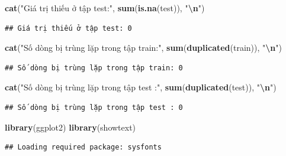 \documentclass[
]{article}
\newenvironment{Shaded}{\begin{snugshade}}{\end{snugshade}}
\newcommand{\FunctionTok}[1]{\textcolor[rgb]{0.13,0.29,0.53}{\textbf{#1}}}
\newcommand{\NormalTok}[1]{#1}
\newcommand{\SpecialCharTok}[1]{\textcolor[rgb]{0.81,0.36,0.00}{\textbf{#1}}}
\newcommand{\StringTok}[1]{\textcolor[rgb]{0.31,0.60,0.02}{#1}}
\begin{document}
\begin{Shaded}
\begin{Highlighting}[]
\FunctionTok{cat}\NormalTok{(}\StringTok{"Giá trị thiếu ở tập test:"}\NormalTok{, }\FunctionTok{sum}\NormalTok{(}\FunctionTok{is.na}\NormalTok{(test)), }\StringTok{"}\SpecialCharTok{\textbackslash{}n}\StringTok{"}\NormalTok{)}
\end{Highlighting}
\end{Shaded}

\begin{verbatim}
## Giá trị thiếu ở tập test: 0
\end{verbatim}

\begin{Shaded}
\begin{Highlighting}[]
\FunctionTok{cat}\NormalTok{(}\StringTok{"Số dòng bị trùng lặp trong tập train:"}\NormalTok{, }\FunctionTok{sum}\NormalTok{(}\FunctionTok{duplicated}\NormalTok{(train)), }\StringTok{"}\SpecialCharTok{\textbackslash{}n}\StringTok{"}\NormalTok{)}
\end{Highlighting}
\end{Shaded}

\begin{verbatim}
## Số dòng bị trùng lặp trong tập train: 0
\end{verbatim}

\begin{Shaded}
\begin{Highlighting}[]
\FunctionTok{cat}\NormalTok{(}\StringTok{"Số dòng bị trùng lặp trong tập test :"}\NormalTok{, }\FunctionTok{sum}\NormalTok{(}\FunctionTok{duplicated}\NormalTok{(test)), }\StringTok{"}\SpecialCharTok{\textbackslash{}n}\StringTok{"}\NormalTok{)}
\end{Highlighting}
\end{Shaded}

\begin{verbatim}
## Số dòng bị trùng lặp trong tập test : 0
\end{verbatim}

\begin{Shaded}
\begin{Highlighting}[]
\FunctionTok{library}\NormalTok{(ggplot2)}
\FunctionTok{library}\NormalTok{(showtext)}
\end{Highlighting}
\end{Shaded}

\begin{verbatim}
## Loading required package: sysfonts
\end{verbatim}
\end{document}

